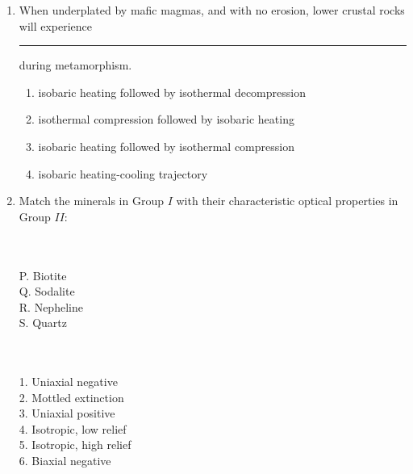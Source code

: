 \documentclass[12pt,fleqn]{article}
\theoremstyle{remark}
\begin{document}
\begin{enumerate}[label=Q.\arabic*.]
\begin {enumerate}
\begin{multicols}{2}
                \end{multicols}
            \end{enumerate}
    \item When underplated by mafic magmas, and with no erosion, lower crustal rocks will experience \rule{2.5cm}{0.15mm} during metamorphism. \hfill{} 
        \begin{enumerate}
                \item isobaric heating followed by isothermal decompression 
                \item isothermal compression followed by isobaric heating
                \item isobaric heating followed by isothermal compression 
                \item isobaric heating-cooling trajectory                 
            \end{enumerate}
    \item Match the minerals in Group $I$ with their characteristic optical properties in Group $II$: \hfill{} \\
    
\begin{multicols}{2}
            \\\\
            P. Biotite\\
            Q. Sodalite\\
            R. Nepheline\\
            S. Quartz

            \columnbreak
            
            \\\\
            1. Uniaxial negative\\
            2. Mottled extinction\\
            3. Uniaxial positive\\
            4. Isotropic, low relief\\
            5. Isotropic, high relief\\
            6. Biaxial negative


\end{multicols}
\end{enumerate}
\end{document}
